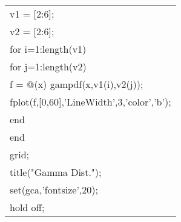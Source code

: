 \begin{enumerate}
{\begin{center}
{\begin{tabular}{p{}}
							v1 = [2:6];\\
							v2 = [2:6];\\
							for i=1:length(v1)\\
 							\quad   for j=1:length(v2)\\
     						\quad \quad	  f = @(x) gampdf(x,v1(i),v2(j));\\
      						\quad \quad	  fplot(f,[0,60],'LineWidth',3,'color','b');\\
  							\quad  end\\
							end\\
							grid; \\ 
							title("Gamma Dist.");  \\ 
							set(gca,'fontsize',20); \\
							hold off;\\
						\end{tabular}
					}
					\end{center}					
				}								
			\end{enumerate}
